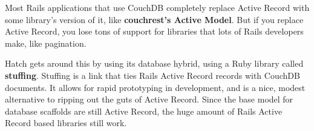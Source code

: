 Most Rails applications that use CouchDB completely replace Active Record with some
library's version of it, like \textbf{couchrest's Active Model}. But if you replace
Active Record, you lose tons of support for libraries that lots of Rails developers
make, like pagination. 

Hatch gets around this by using its database hybrid, using a Ruby library called
\textbf{stuffing}. Stuffing is a link that ties Rails Active Record records with
CouchDB documents. It allows for rapid prototyping in development, and is a nice, modest
alternative to ripping out the guts of Active Record. Since the base model for 
database scaffolds are still Active Record, the huge amount of Rails Active Record based
libraries still work.


